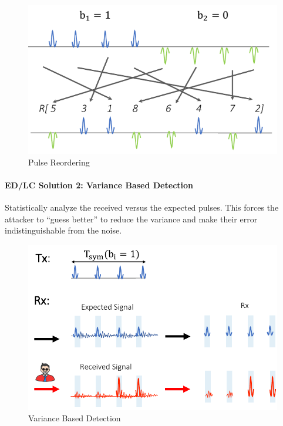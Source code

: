 \begin{figure}[h]
	\centering
	\includegraphics[scale=0.45]{images/5-pulse-reordering.png}
	\caption{Pulse Reordering}%
	\label{fig:pulse-reordering}
\end{figure}

\paragraph{ED/LC Solution 2: Variance Based Detection}
Statistically analyze the received versus the expected pulses.
This forces the attacker to ``guess better'' to reduce the variance and make their error indistinguishable from the noise.

\begin{figure}[h]
	\centering
	\includegraphics[scale=0.4]{images/5-variance-based.png}
	\caption{Variance Based Detection}%
	\label{fig:variance-based}
\end{figure}


